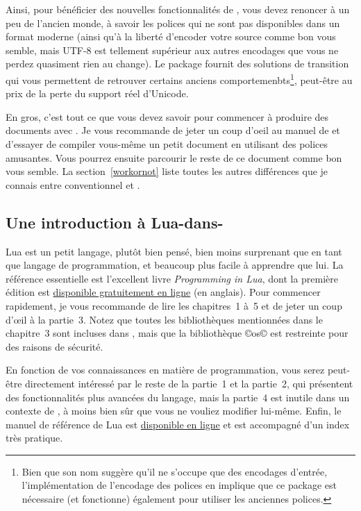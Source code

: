 \documentclass{lltxdoc}
\begin{document}
\medskip

Ainsi, pour bénéficier des nouvelles fonctionnalités de \luatex, vous devez
renoncer à un peu de l'ancien monde, à savoir les polices qui ne sont pas
disponibles dans un format moderne (ainsi qu'à la liberté d'encoder votre source
comme bon vous semble, mais UTF-8 est tellement supérieur aux autres encodages
que vous ne perdez quasiment rien au change). Le package 
fournit des solutions de transition qui vous permettent de retrouver certains
anciens comportemenbts\footnote{Bien que son nom suggère qu'il ne s'occupe
  que des encodages d'entrée, l'implémentation de l'encodage des polices
  en \latex implique que ce package est nécessaire (et fonctionne)
  également pour utiliser les anciennes polices.}, peut-être au prix
de la perte du support réel d'Unicode.

En gros, c'est tout ce que vous devez savoir pour commencer à produire des
documents avec \lualatex. Je vous recommande de jeter un coup d'oeil au manuel
de  et d'essayer de compiler vous-même un petit document
en utilisant des polices amusantes.
Vous pourrez ensuite parcourir le reste de ce document comme bon vous semble.
La section~\ref{workornot} liste toutes les autres différences que je connais
entre \latex conventionnel et \lualatex.


\subsection{Une introduction à Lua-dans-\tex}\label{luaintex}

Lua est un petit langage, plutôt bien pensé, bien moins surprenant que \tex
en tant que langage de programmation, et beaucoup plus facile à apprendre que lui.
La référence essentielle est l'excellent livre \emph{Programming in Lua},
dont la première édition est \href{http://www.lua.org/pil/}{disponible gratuitement en ligne}
(en anglais). Pour commencer rapidement, je vous recommande de lire les
chapitres~1 à~5 et de jeter un coup d'\oe il à la partie~3. Notez que toutes
les bibliothèques mentionnées dans le chapitre~3 sont incluses dans \luatex,
mais que la bibliothèque ©os© est restreinte pour des raisons de sécurité.

En fonction de vos connaissances en matière de programmation, vous serez
peut-être directement intéressé par le reste de la partie~1 et la partie~2,
qui présentent des fonctionnalités plus avancées du langage, mais la partie~4
est inutile dans un contexte de \luatex, à moins bien sûr que vous ne vouliez
modifier \luatex lui-même. Enfin, le manuel de référence de Lua est
\href{http://www.lua.org/manual/5.2/}{disponible en ligne} et est accompagné d'un index très pratique.
\end{document}
